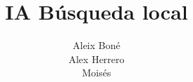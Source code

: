 

\title{IA Búsqueda local}
\author{%
    Aleix Boné\\
    Alex Herrero\\
    Moisés
}
\date{%
}


    \maketitle

